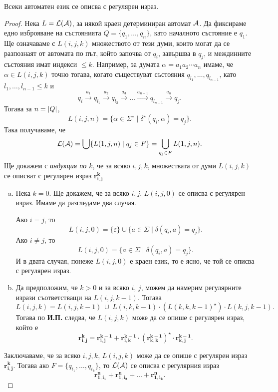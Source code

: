 \begin{framed}
\begin{thm}[Клини]
  \label{th:regular-kleene}
  Всеки автоматен език се описва с регулярен израз.
\end{thm}
\end{framed}
\begin{proof}
  Нека  $L = \mathcal{L}(\mathcal{A})$, за някой краен детерминиран автомат $\mathcal{A}$.
  Да фиксираме едно изброяване на състоянията $Q = \{q_1,\dots,q_n\}$,
  като началното състояние е $q_1$.
  Ще означаваме с $L(i,j,k)$ множеството от тези думи, които
  могат да се разпознаят от автомата по път, който започва от $q_i$,
  завършва в $q_j$, и междинните състояния имат индекси $\leq k$.
  Например, за думата $\alpha = a_1a_2\cdots a_n$ имаме, че $\alpha \in L(i,j,k)$
  точно тогава, когато съществуват състояния $q_{l_1},\dots,q_{l_{n-1}}$, като $l_1,\dots,l_{n-1} \leq k$ и
  \[q_i\stackrel{a_1}{\rightarrow} q_{l_1} \stackrel{a_2}{\rightarrow} q_{l_2} \stackrel{a_3}{\rightarrow} \dots \stackrel{a_{n-1}}{\rightarrow} q_{l_{n-1}}\stackrel{a_n}{\rightarrow} q_j.\]
  Тогава за $n = \lvert{Q}\rvert$, 
  \[L(i,j,n) = \{\alpha\in\Sigma^\star\mid \delta^\star(q_i,\alpha) = q_j\}.\]
  Така получаваме, че 
  \[\mathcal{L}(\mathcal{A}) = \bigcup\{L(1,j,n)\mid q_j \in F\} = \bigcup_{q_j\in F}L(1,j,n).\]
  Ще докажем с {\em индукция по $k$}, че за всяко $i,j,k$, множествата от думи $L(i,j,k)$
  се описват с регулярен израз $\mathbf{r^k_{i,j}}$
  \begin{enumerate}[a)]
  \item
    Нека $k = 0$. Ще докажем, че за всяко $i,j$, $L(i,j,0)$ се описва с регулярен израз.
    Имаме да разгледаме два случая.
    
    Ако $i = j$, то 
    \begin{equation}
      \label{eq:kleene-equal}
      L(i, j, 0) = \{\varepsilon\}\cup\{a\in\Sigma \mid \delta(q_i,a) = q_j\}.
    \end{equation}
    Ако $i \neq j$, то
    \[L(i, j, 0) = \{a\in\Sigma \mid \delta(q_i, a) = q_j\}.\]
    И в двата случая, понеже $L(i,j,0)$ е краен език, то е ясно, че той се описва с регулярен израз.
  \item
    Да предположим, че $k > 0$ и за всяко $i$, $j$, можем да намерим регулярните изрази
    съответстващи на $L(i,j,k-1)$. Тогава
    \[L(i,j,k) = L(i,j,k-1)\ \cup\ L(i,k,k-1)\cdot (L(k,k,k-1)^\star) \cdot L(k,j,k-1).\]
    Тогава по {\bf И.П.} следва, че $L(i,j,k)$ може да се опише с регулярен израз, който е
    \begin{equation}
      \label{eq:kleene}
      \mathbf{r^k_{i,j}} = \mathbf{r^{k-1}_{i,j} + r^{k-1}_{i,k}\cdot (r^{k-1}_{k,k})^\star\cdot r^{k-1}_{k,j}}.
    \end{equation}
  \end{enumerate}
  Заключаваме, че за всяко $i,j,k$, $L(i,j,k)$ може да се опише с регулярен израз $\mathbf{r^{k}_{i,j}}$.
  Тогава ако $F = \{q_{i_1},\dots,q_{i_k}\}$, то $\mathcal{L}(\mathcal{A})$ се описва с регулярния израз
  \[\mathbf{r^n_{1,i_1} + r^n_{1,i_2} + \dots + r^n_{1,i_k}}.\]
\end{proof}

